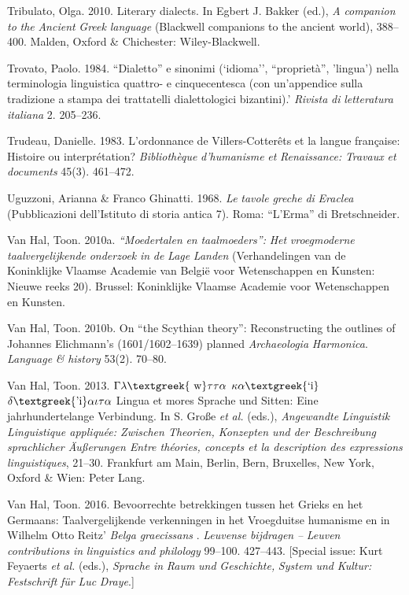 Tribulato, Olga. 2010. Literary dialects. In Egbert J. Bakker (ed.), \textit{A} \textit{companion} \textit{to} \textit{the} \textit{Ancient} \textit{Greek} \textit{language} (Blackwell companions to the ancient world), 388–400. Malden, Oxford \& Chichester: Wiley-Blackwell.

Trovato, Paolo. 1984. “Dialetto” e sinonimi (‘idioma’’, “proprietà”, ’lingua’) nella terminologia linguistica quattro- e cinquecentesca (con un’appendice sulla tradizione a stampa dei trattatelli dialettologici bizantini).’ \textit{Rivista} \textit{di} \textit{letteratura} \textit{italiana} 2. 205–236.

Trudeau, Danielle. 1983. L’ordonnance de Villers-Cotterêts et la langue française: Histoire ou interprétation? \textit{Bibliothèque} \textit{d’humanisme} \textit{et} \textit{Renaissance:} \textit{Travaux} \textit{et} \textit{documents} 45(3). 461–472.

Uguzzoni, Arianna \& Franco Ghinatti. 1968. \textit{Le} \textit{tavole} \textit{greche} \textit{di} \textit{Eraclea} (Pubblicazioni dell’Istituto di storia antica 7). Roma: “L’Erma” di Bretschneider.

Van Hal, Toon. 2010a. \textit{“Moedertalen} \textit{en} \textit{taalmoeders”:} \textit{Het} \textit{vroegmoderne} \textit{taalvergelijkende} \textit{onderzoek} \textit{in} \textit{de} \textit{Lage} \textit{Landen} (Verhandelingen van de Koninklijke Vlaamse Academie van België voor Wetenschappen en Kunsten: Nieuwe reeks 20). Brussel: Koninklijke Vlaamse Academie voor Wetenschappen en Kunsten.

Van Hal, Toon. 2010b. On “the Scythian theory”: Reconstructing the outlines of Johannes Elichmann’s (1601/1602–1639) planned \textit{Archaeologia} \textit{Harmonica}. \textit{Language} \textit{\&} \textit{history} 53(2). 70–80.

Van Hal, Toon. 2013. $\Gamma \lambda \text{\textgreek{~w}}\tau \tau \alpha $ $\kappa \alpha \text{\textgreek{`i}}$ $\delta \text{\textgreek{'i}}\alpha \iota \tau \alpha $ {\textbar} Lingua et mores {\textbar} Sprache und Sitten: Eine jahrhundertelange Verbindung. In S. Große \textit{et} \textit{al.} (eds.), \textit{Angewandte} \textit{Linguistik} \textit{{\textbar} Linguistique appliquée: Zwischen Theorien, Konzepten und der Beschreibung sprachlicher Äußerungen {\textbar} Entre théories, concepts et la description des expressions linguistiques}, 21–30. Frankfurt am Main, Berlin, Bern, Bruxelles, New York, Oxford \& Wien: Peter Lang.

Van Hal, Toon. 2016. Bevoorrechte betrekkingen tussen het Grieks en het Germaans: Taalvergelijkende verkenningen in het Vroegduitse humanisme en in Wilhelm Otto Reitz’ \textit{Belga} \textit{graecissans} . \textit{Leuvense} \textit{bijdragen} \textit{–} \textit{Leuven} \textit{contributions} \textit{in} \textit{linguistics} \textit{and} \textit{philology} 99–100. 427–443. [Special issue: Kurt Feyaerts \textit{et} \textit{al.} (eds.), \textit{Sprache} \textit{in} \textit{Raum} \textit{und} \textit{Geschichte,} \textit{System} \textit{und} \textit{Kultur:} \textit{Festschrift} \textit{für} \textit{Luc} \textit{Draye}.]

